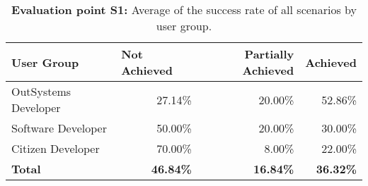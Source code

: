 \begin{table}[tb]
    \caption{\textbf{Evaluation point S1:} Average of the success rate of all scenarios by user group.}
    \label{tab:effectiveness_summary_existing_interface}
    \begin{tabular}{lrrr}
    \hline
    \rowcolor[HTML]{EFEFEF} 
    \textbf{User Group}  & \multicolumn{1}{l}{\cellcolor[HTML]{EFEFEF}\textbf{Not Achieved}} & \multicolumn{1}{C{2cm}}{\cellcolor[HTML]{EFEFEF}\textbf{Partially Achieved}} & \multicolumn{1}{l}{\cellcolor[HTML]{EFEFEF}\textbf{Achieved}} \\ \hline
    OutSystems Developer & 27.14\%                                                           & 20.00\%                                                                  & 52.86\%                                                       \\
    Software Developer   & 50.00\%                                                           & 20.00\%                                                                  & 30.00\%                                                       \\
    Citizen Developer    & 70.00\%                                                           & 8.00\%                                                                  & 22.00\%                                                       \\
    \textbf{Total}       & \textbf{46.84\%}                                                  & \textbf{16.84\%}                                                         & \textbf{36.32\%}                                              \\ \hline
    \end{tabular}
    \end{table}


